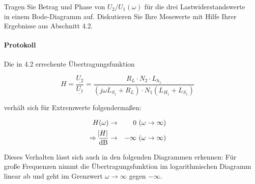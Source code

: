 \documentclass[10pt]{scrreprt}
\begin{document}
        \vspace{0.5cm}

        Tragen Sie Betrag und Phase von $U_2 /U_1 (\omega)$ für die drei Lastwiderstandswerte in
        einem Bode-Diagramm auf. Diskutieren Sie Ihre Messwerte mit Hilfe Ihrer Ergebnisse aus
        Abschnitt 4.2.

        \paragraph{Protokoll}
        Die in 4.2 errechente Übertragungsfunktion

        \begin{equation*}
            H = \frac{\underline{U_2}}{\underline{U_1}} = \frac{R_L \cdot N_2 \cdot
            L_{h_1}}{(j \omega L_{S_1} + R_L) \cdot N_1 (L_{H_1} + L_{S_1})}
        \end{equation*}

        \vspace{0.2cm}

        verhält sich für Extremwerte folgendermaßen:

        \begin{eqnarray*}
            H(\omega) &\rightarrow& 0 \ (\omega \rightarrow \infty)\\
            \Rightarrow \frac{\abs{H}}{\text{dB}} &\rightarrow& -\infty \ (\omega \rightarrow \infty)
        \end{eqnarray*}

        Dieses Verhalten lässt sich auch in den folgenden Diagrammen erkennen:
        Für große Frequenzen nimmt die Übertragungsfunktion im logarithmischen
        Diagramm linear ab und geht im Grenzwert $\omega \rightarrow \infty$
        gegen $-\infty$.
\end{document}
